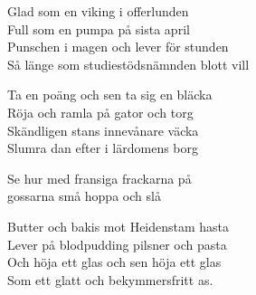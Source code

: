 \vspace{10pt}
Glad som en viking i offerlunden\\
Full som en pumpa på sista april\\
Punschen i magen och lever för stunden\\
Så länge som studiestödsnämnden blott vill\par
\vspace{10pt}
Ta en poäng och sen ta sig en bläcka\\
Röja och ramla på gator och torg\\
Skändligen stans innevånare väcka\\
Slumra dan efter i lärdomens borg\par
\vspace{10pt}
Se hur med fransiga frackarna på\\
gossarna små hoppa och slå\par
\vspace{10pt}
Butter och bakis mot Heidenstam hasta\\
Lever på blodpudding pilsner och pasta\\
Och höja ett glas och sen höja ett glas\\
Som ett glatt och bekymmersfritt as.
